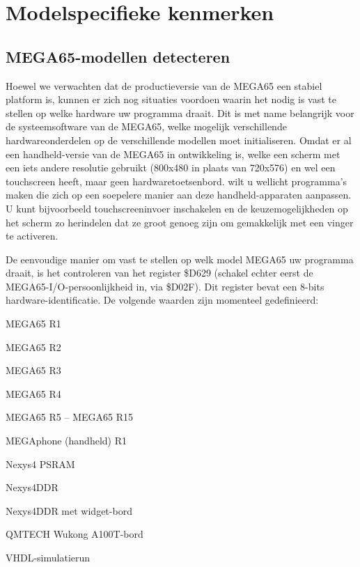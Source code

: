 \chapter{Modelspecifieke kenmerken}

\section{MEGA65-modellen detecteren}

Hoewel we verwachten dat de productieversie van de MEGA65 een stabiel platform is, kunnen er zich nog situaties voordoen waarin het nodig is vast te stellen op welke hardware uw programma draait. Dit is met name belangrijk voor de systeemsoftware van de MEGA65, welke mogelijk verschillende hardwareonderdelen op de verschillende modellen moet initialiseren. Omdat er al een handheld-versie van de MEGA65 in ontwikkeling is, welke een scherm met een iets andere resolutie gebruikt (800x480 in plaats van 720x576) en wel een touchscreen heeft, maar geen hardwaretoetsenbord. wilt u wellicht programma's maken die zich op een soepelere manier aan deze handheld-apparaten aanpassen. U kunt bijvoorbeeld touchscreeninvoer inschakelen en de keuzemogelijkheden op het scherm zo herindelen dat ze groot genoeg zijn om gemakkelijk met een vinger te activeren.

De eenvoudige manier om vast te stellen op welk model MEGA65 uw programma draait, is het controleren van het register \$D629 (schakel echter eerst de MEGA65-I/O-persoonlijkheid in, via \$D02F). Dit register bevat een 8-bits hardware-identificatie. De volgende waarden zijn momenteel gedefinieerd:

\begin{description}[align=left,labelwidth=0.2cm]
\item[\$01 (1)] MEGA65 R1\item[\$02 (2)] MEGA65 R2\item[\$03 (3)] MEGA65 R3\item[\$04 (4)] MEGA65 R4\item[\$05 -- \$0F (5 -- 15)] MEGA65 R5 -- MEGA65 R15\item[\$21 (33)] MEGAphone (handheld) R1\item[\$40 (64)] Nexys4 PSRAM\item[\$41 (65)] Nexys4DDR\item[\$42 (66)] Nexys4DDR met widget-bord\item[\$FD (253)] QMTECH Wukong A100T-bord\item[\$FE (254)] VHDL-simulatierun
\end{description}


